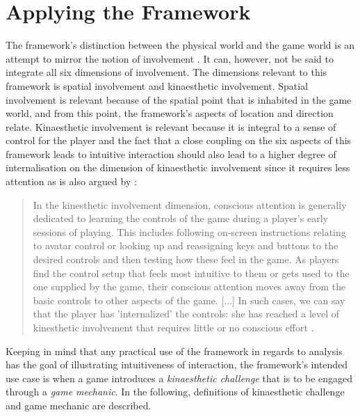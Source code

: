 \section{Applying the Framework}
The framework's distinction between the physical world and the game world is an attempt to mirror the notion of involvement \cite{calleja}. It can, however, not be said to integrate all six dimensions of involvement. The dimensions relevant to this framework is spatial involvement and kinaesthetic involvement. Spatial involvement is relevant because of the spatial point that is inhabited in the game world, and from this point, the framework's aspects of location and direction relate. Kinaesthetic involvement is relevant because it is integral to a sense of control for the player and the fact that a close coupling on the six aspects of this framework leads to intuitive interaction \cite{frogger} should also lead to a higher degree of internalisation on the dimension of kinaesthetic involvement since it requires less attention as is also argued by \cite{calleja}:
\begin{quote}
  In the kinesthetic involvement dimension, conscious attention is generally dedicated to learning the controls of the game during a player’s early sessions of playing. This includes following on-screen instructions relating to avatar control or looking up and reassigning keys and buttons to the desired controls and then testing how these feel in the game. As players find the control setup that feels most intuitive to them or gets used to the one supplied by the game, their conscious attention moves away from the basic controls to other aspects of the game. [...] In such cases, we can say that the player has 'internalized' the controls: she has reached a level of kinesthetic involvement that requires little or no conscious effort \cite[p. 45]{calleja}.
\end{quote}
Keeping in mind that any practical use of the framework in regards to analysis has the goal of illustrating intuitiveness of interaction, the framework's intended use case is when a game introduces a \textit{kinaesthetic challenge} that is to be engaged through a \textit{game mechanic}. In the following, definitions of kinaesthetic challenge and game mechanic are described.

